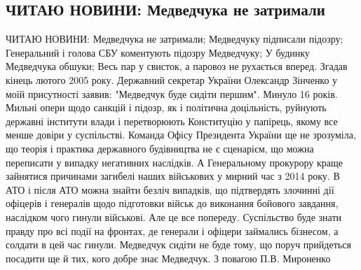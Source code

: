  
 
 
 
 
\subsection{ЧИТАЮ НОВИНИ: Медведчука не затримали}

ЧИТАЮ НОВИНИ:
Медведчука не затримали;
Медведчуку підписали підозру;
Генеральний і голова СБУ коментують підозру Медведчуку;
У будинку Медведчука обшуки;
Весь пар у свисток, а паровоз не рухається вперед.
Згадав кінець лютого 2005 року.
Державний секретар України Олександр Зінченко у моїй присутності заявив: "Медведчук буде сидіти першим".
Минуло 16 років.
Мильні опери щодо санкцій і підозр, як і політична доцільність, руйнують державні інститути влади і перетворюють Конституцію у папірець, якому все менше довіри у суспільстві.
Команда Офісу Президента України ще не зрозуміла, що теорія і практика державного будівництва не є сценарієм, що можна переписати у випадку негативних наслідків.
А Генеральному прокурору краще зайнятися причинами загибелі наших військових у мирний час з 2014 року. В АТО і після АТО можна знайти безліч випадків, що підтвердять злочинні дії офіцерів і генералів щодо підготовки військ до виконання бойового завдання, наслідком чого гинули військові. 
Але це все попереду. Суспільство буде знати правду про всі події на фронтах, де генерали і офіцери займались бізнесом, а солдати в цей час гинули.
Медведчук сидіти не буде тому, що поруч прийдеться посадити ще й тих, кого добре знає Медведчук.
З повагою П.В. Мироненко
